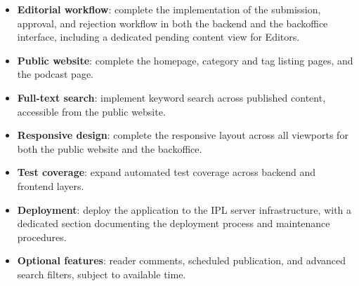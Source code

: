 \begin{itemize}
  \item \textbf{Editorial workflow}: complete the implementation of the
        submission, approval, and rejection workflow in both the backend and
        the backoffice interface, including a dedicated pending content view
        for Editors.

  \item \textbf{Public website}: complete the homepage, category and tag listing
        pages, and the podcast page.

  \item \textbf{Full-text search}: implement keyword search across published
        content, accessible from the public website.

  \item \textbf{Responsive design}: complete the responsive layout across all
        viewports for both the public website and the backoffice.

  \item \textbf{Test coverage}: expand automated test coverage across backend
        and frontend layers.

  \item \textbf{Deployment}: deploy the application to the IPL server
        infrastructure, with a dedicated section documenting the deployment
        process and maintenance procedures.

  \item \textbf{Optional features}: reader comments, scheduled publication,
        and advanced search filters, subject to available time.
\end{itemize}